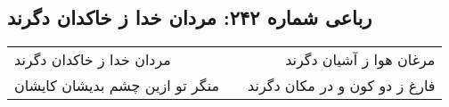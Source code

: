 \begin{center}
\section*{رباعی شماره ۲۴۲: مردان خدا ز خاکدان دگرند}
\label{sec:sh242}
\begin{longtable}{l p{0.5cm} r}
مردان خدا ز خاکدان دگرند
&&
مرغان هوا ز آشیان دگرند
\\
منگر تو ازین چشم بدیشان کایشان
&&
فارغ ز دو کون و در مکان دگرند
\\
\end{longtable}
\end{center}
